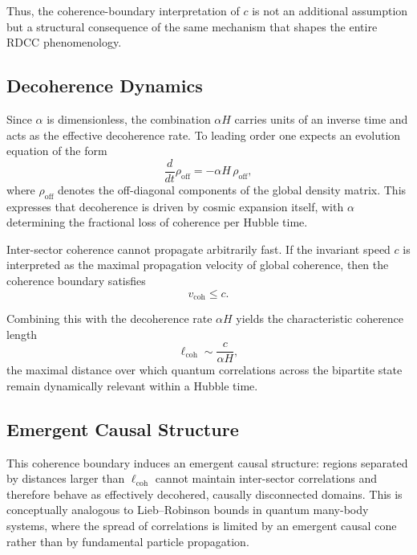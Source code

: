 \documentclass[11pt,a4paper]{article}
\begin{document}
Thus, the coherence-boundary interpretation of $c$ is not an additional assumption but a
structural consequence of the same mechanism that shapes the entire RDCC phenomenology.

\subsection{Decoherence Dynamics}

Since $\alpha$ is dimensionless, the combination $\alpha H$ carries units of an inverse time
and acts as the effective decoherence rate. To leading order one expects an evolution equation
of the form
\begin{equation}
    \frac{d}{dt}\rho_{\mathrm{off}}
    = - \alpha H\,\rho_{\mathrm{off}},
\end{equation}
where $\rho_{\mathrm{off}}$ denotes the off-diagonal components of the global density matrix.
This expresses that decoherence is driven by cosmic expansion itself, with $\alpha$ determining
the fractional loss of coherence per Hubble time.

Inter-sector coherence cannot propagate arbitrarily fast. If the invariant speed $c$ is
interpreted as the maximal propagation velocity of global coherence, then the coherence
boundary satisfies
\begin{equation}
    v_{\mathrm{coh}} \leq c.
\end{equation}

Combining this with the decoherence rate $\alpha H$ yields the characteristic coherence
length
\begin{equation}
    \ell_{\mathrm{coh}}
    \sim \frac{c}{\alpha H},
\end{equation}
the maximal distance over which quantum correlations across the bipartite state remain
dynamically relevant within a Hubble time.

\subsection{Emergent Causal Structure}

This coherence boundary induces an emergent causal structure: regions separated by
distances larger than $\ell_{\mathrm{coh}}$ cannot maintain inter-sector correlations and therefore
behave as effectively decohered, causally disconnected domains. This is conceptually
analogous to Lieb–Robinson bounds in quantum many-body systems, where the spread of
correlations is limited by an emergent causal cone rather than by fundamental particle
propagation.
\end{document}
